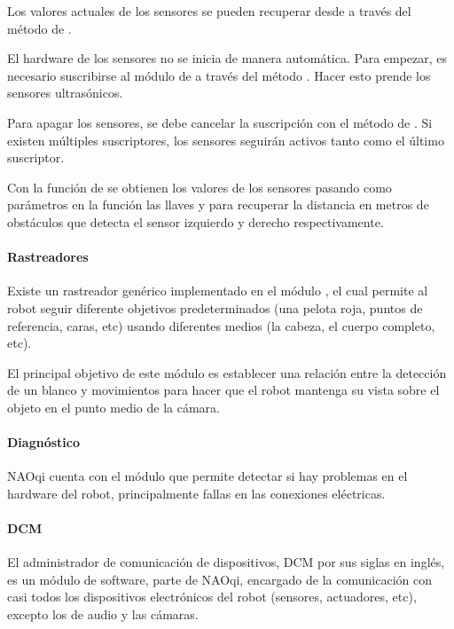 Los valores actuales de los sensores se pueden recuperar desde  a través
del método  de .


El hardware de los sensores no se inicia de manera automática. Para empezar,
es necesario suscribirse al módulo de  a través del método .
Hacer esto prende los sensores ultrasónicos.

Para apagar los sensores, se debe cancelar la suscripción con el método
 de . Si existen múltiples suscriptores,
los sensores seguirán activos tanto como el último suscriptor.

Con la función  de  se obtienen los valores de los sensores
pasando como parámetros en la función las llaves
 y
 para recuperar la distancia
en metros de obstáculos que detecta el sensor izquierdo y derecho
respectivamente.


\paragraph{Rastreadores}
\label{\detokenize{chapter_one/naoqi:rastreadores}}
Existe un rastreador genérico implementado en el módulo , el cual
permite al robot seguir diferente objetivos predeterminados (una pelota roja,
puntos de referencia, caras, etc) usando diferentes medios (la cabeza, el
cuerpo completo, etc).

El principal objetivo de este módulo es establecer una relación entre la
detección de un blanco y movimientos para hacer que el robot mantenga
su vista sobre el objeto en el punto medio de la cámara.


\paragraph{Diagnóstico}
\label{\detokenize{chapter_one/naoqi:diagnostico}}
NAOqi cuenta con el módulo   que permite detectar si hay
problemas en el hardware del robot, principalmente fallas en las conexiones eléctricas.


\paragraph{DCM}
\label{\detokenize{chapter_one/naoqi:dcm}}
El administrador de comunicación de dispositivos, DCM por sus siglas en inglés,
es un módulo de software, parte de NAOqi, encargado de la comunicación con
casi todos los dispositivos electrónicos del robot (sensores, actuadores, etc),
excepto los de audio y las cámaras.


